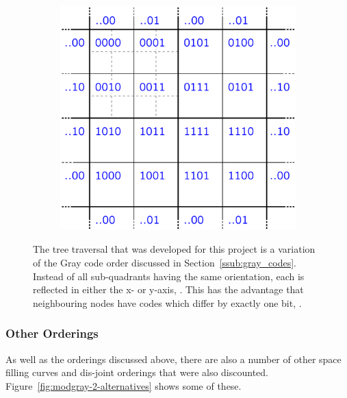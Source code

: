 \begin{figure}[tbhp]
\begin{subfigure}[c]{4.6cm}
		\includegraphics[width=\textwidth]{modgray-2-levels-numbers.pdf}
		\caption{}\label{fig:modgray-2-levels-numbers.pdf}
	\end{subfigure}

	\caption[Modified Gray Code ordering]{The tree traversal that was developed
		for this project is a variation of the Gray code order discussed in
		Section~\ref{ssub:gray_codes}.  Instead of all sub-quadrants having the
		same orientation, each is reflected in either the x- or y-axis,
		. This has the advantage that
		neighbouring nodes have codes which differ by exactly one bit,
		.}\label{fig:modgray-traversal}
\end{figure}


\subsubsection{Other Orderings}
\label{ssub:other_orderings}

As well as the orderings discussed above, there are also a number of other
space filling curves and dis-joint orderings that were also discounted.
Figure~\ref{fig:modgray-2-alternatives} shows some of these.

